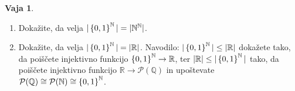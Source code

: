 \documentclass{article}
\newcommand{\pow}{\mathcal{P}}
\newcommand{\NN}{\mathbb{N}}
\newcommand{\QQ}{\mathbb{Q}}
\newcommand{\RR}{\mathbb{R}}
\theoremstyle{definition}
\newtheorem{vaja}{Vaja}
\begin{document}
\begin{vaja}
  \
  \begin{enumerate}
    \item
      Dokažite, da velja $|\set{0,1}^\NN| = |\NN^\NN|$.
    \item
      Dokažite, da velja $|\set{0,1}^\NN| = |\RR|$. Navodilo: $|\set{0,1}^\NN| \leq |\RR|$ dokažete tako, da poiščete injektivno funkcijo $\set{0,1}^\NN \to \RR$, ter $|\RR| \leq |\set{0,1}^\NN|$ tako, da poiščete injektivno funkcijo $\RR \to \pow(\QQ)$ in upoštevate $\pow(\QQ) \cong \pow(\NN) \cong \set{0,1}^\NN$.
  \end{enumerate}
\end{vaja}
\end{document}
